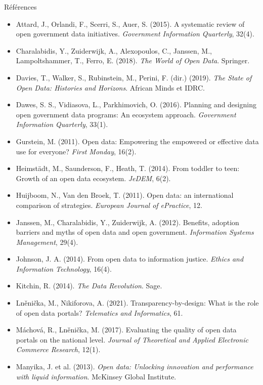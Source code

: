 \documentclass[11pt,aspectratio=169]{beamer}
\begin{document}
\begin{frame}[allowframebreaks]{Références}
  \scriptsize
  \begin{itemize}
    \item Attard, J., Orlandi, F., Scerri, S., Auer, S. (2015). A systematic review of open government data initiatives. \emph{Government Information Quarterly}, 32(4).
    \item Charalabidis, Y., Zuiderwijk, A., Alexopoulos, C., Janssen, M., Lampoltshammer, T., Ferro, E. (2018). \emph{The World of Open Data}. Springer.
    \item Davies, T., Walker, S., Rubinstein, M., Perini, F. (dir.) (2019). \emph{The State of Open Data: Histories and Horizons}. African Minds et IDRC.
    \item Dawes, S. S., Vidiasova, L., Parkhimovich, O. (2016). Planning and designing open government data programs: An ecosystem approach. \emph{Government Information Quarterly}, 33(1).
    \item Gurstein, M. (2011). Open data: Empowering the empowered or effective data use for everyone? \emph{First Monday}, 16(2).
    \item Heimstädt, M., Saunderson, F., Heath, T. (2014). From toddler to teen: Growth of an open data ecosystem. \emph{JeDEM}, 6(2).
    \item Huijboom, N., Van den Broek, T. (2011). Open data: an international comparison of strategies. \emph{European Journal of ePractice}, 12.
    \item Janssen, M., Charalabidis, Y., Zuiderwijk, A. (2012). Benefits, adoption barriers and myths of open data and open government. \emph{Information Systems Management}, 29(4).
    \item Johnson, J. A. (2014). From open data to information justice. \emph{Ethics and Information Technology}, 16(4).
    \item Kitchin, R. (2014). \emph{The Data Revolution}. Sage.
    \item Lněnička, M., Nikiforova, A. (2021). Transparency-by-design: What is the role of open data portals? \emph{Telematics and Informatics}, 61.
    \item Máchová, R., Lněnička, M. (2017). Evaluating the quality of open data portals on the national level. \emph{Journal of Theoretical and Applied Electronic Commerce Research}, 12(1).
    \item Manyika, J. et al. (2013). \emph{Open data: Unlocking innovation and performance with liquid information}. McKinsey Global Institute.

\end{itemize}
\end{frame}
\end{document}
